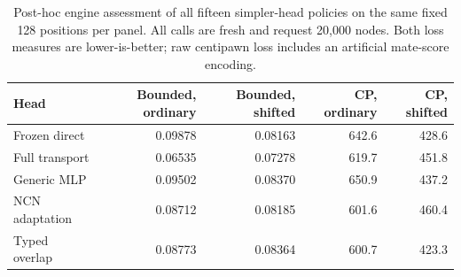 \begin{table}[ht]
\centering\small
\caption{Post-hoc engine assessment of all fifteen simpler-head policies on the same fixed 128 positions per panel. All calls are fresh and request 20,000 nodes. Both loss measures are lower-is-better; raw centipawn loss includes an artificial mate-score encoding.}
\begin{tabular}{lrrrr}
\toprule
Head & Bounded, ordinary & Bounded, shifted & CP, ordinary & CP, shifted \\
\midrule
Frozen direct & 0.09878 & 0.08163 & 642.6 & 428.6 \\
Full transport & 0.06535 & 0.07278 & 619.7 & 451.8 \\
Generic MLP & 0.09502 & 0.08370 & 650.9 & 437.2 \\
NCN adaptation & 0.08712 & 0.08185 & 601.6 & 460.4 \\
Typed overlap & 0.08773 & 0.08364 & 600.7 & 423.3 \\
\bottomrule
\end{tabular}
\end{table}
